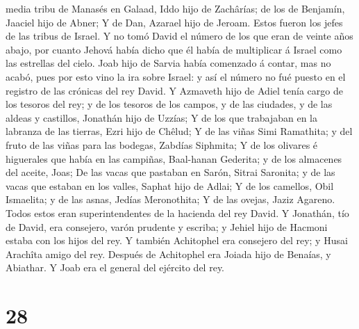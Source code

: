 media tribu de Manasés en Galaad, Iddo hijo de Zachârías; de los de
Benjamín, Jaaciel hijo de Abner;  Y de Dan, Azarael hijo de
Jeroam. Estos fueron los jefes de las tribus de Israel.  Y
no tomó David el número de los que eran de veinte años abajo, por cuanto
Jehová había dicho que él había de multiplicar á Israel como las
estrellas del cielo.  Joab hijo de Sarvia había comenzado á
contar, mas no acabó, pues por esto vino la ira sobre Israel: y así el
número no fué puesto en el registro de las crónicas del rey David.
 Y Azmaveth hijo de Adiel tenía cargo de los tesoros del
rey; y de los tesoros de los campos, y de las ciudades, y de las aldeas
y castillos, Jonathán hijo de Uzzías;  Y de los que
trabajaban en la labranza de las tierras, Ezri hijo de Chêlud;
 Y de las viñas Simi Ramathita; y del fruto de las viñas
para las bodegas, Zabdías Siphmita;  Y de los olivares é
higuerales que había en las campiñas, Baal-hanan Gederita; y de los
almacenes del aceite, Joas;  De las vacas que pastaban en
Sarón, Sitrai Saronita; y de las vacas que estaban en los valles, Saphat
hijo de Adlai;  Y de los camellos, Obil Ismaelita; y de las
asnas, Jedías Meronothita;  Y de las ovejas, Jaziz Agareno.
Todos estos eran superintendentes de la hacienda del rey David.
 Y Jonathán, tío de David, era consejero, varón prudente y
escriba; y Jehiel hijo de Hacmoni estaba con los hijos del rey.
 Y también Achitophel era consejero del rey; y Husai
Arachîta amigo del rey.  Después de Achitophel era Joiada
hijo de Benaías, y Abiathar. Y Joab era el general del ejército del rey.

\hypertarget{section-27}{%
\section{28}\label{section-27}}

